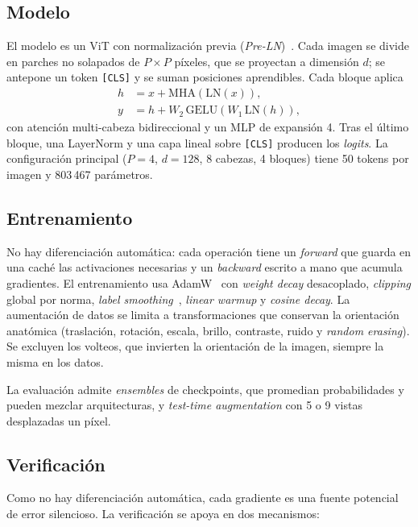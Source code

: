 \documentclass[11pt,a4paper]{article}
\begin{document}
\subsection{Modelo}

El modelo es un ViT con normalización previa (\emph{Pre-LN})~\cite{preln}. Cada
imagen se divide en parches no solapados de $P\times P$ píxeles, que se
proyectan a dimensión $d$; se antepone un token \texttt{[CLS]} y se suman
posiciones aprendibles. Cada bloque aplica
\begin{align*}
  h &= x + \mathrm{MHA}(\mathrm{LN}(x)), \\
  y &= h + W_2\,\mathrm{GELU}(W_1\,\mathrm{LN}(h)),
\end{align*}
con atención multi-cabeza bidireccional y un MLP de expansión 4. Tras el último
bloque, una LayerNorm y una capa lineal sobre \texttt{[CLS]} producen los
\emph{logits}. La configuración principal ($P=4$, $d=128$, 8 cabezas, 4 bloques)
tiene 50 tokens por imagen y 803\,467 parámetros.

\subsection{Entrenamiento}

No hay diferenciación automática: cada operación tiene un \emph{forward} que
guarda en una caché las activaciones necesarias y un \emph{backward} escrito a
mano que acumula gradientes. El entrenamiento usa AdamW~\cite{adamw} con
\emph{weight decay} desacoplado, \emph{clipping} global por norma, \emph{label
smoothing}~\cite{labelsmoothing}, \emph{linear warmup} y \emph{cosine decay}. La
aumentación de datos se limita a transformaciones que conservan la orientación
anatómica (traslación, rotación, escala, brillo, contraste, ruido y
\emph{random erasing}). Se excluyen los volteos, que invierten la orientación
de la imagen, siempre la misma en los datos.

La evaluación admite \emph{ensembles} de checkpoints, que promedian
probabilidades y pueden mezclar arquitecturas, y \emph{test-time augmentation}
con 5 o 9 vistas desplazadas un píxel.

\subsection{Verificación}

Como no hay diferenciación automática, cada gradiente es una fuente potencial
de error silencioso. La verificación se apoya en dos mecanismos:
\end{document}

